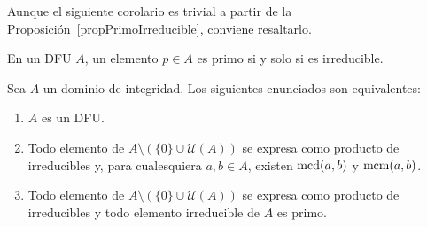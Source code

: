 Aunque el siguiente corolario es trivial a partir de la Proposición~\ref{propPrimoIrreducible}, conviene resaltarlo.
\begin{coro}
    En un DFU $A$, un elemento $p \in A$ es primo si y solo si es irreducible.
\end{coro}

\begin{teo}\label{teoCaracDFU}
    Sea $A$ un dominio de integridad. Los siguientes enunciados son equivalentes:
    \begin{enumerate}
        \item $A$ es un DFU.
        \item Todo elemento de $A \setminus (\{0\} \cup \mathcal{U}(A))$ se expresa como producto de irreducibles y, para cualesquiera $a, b \in A$, existen $\operatorname{mcd}(a,b)$ y $\operatorname{mcm}(a,b)$.
        \item Todo elemento de $A \setminus (\{0\} \cup \mathcal{U}(A))$ se expresa como producto de irreducibles y todo elemento irreducible de $A$ es primo.
    \end{enumerate}
\end{teo}

